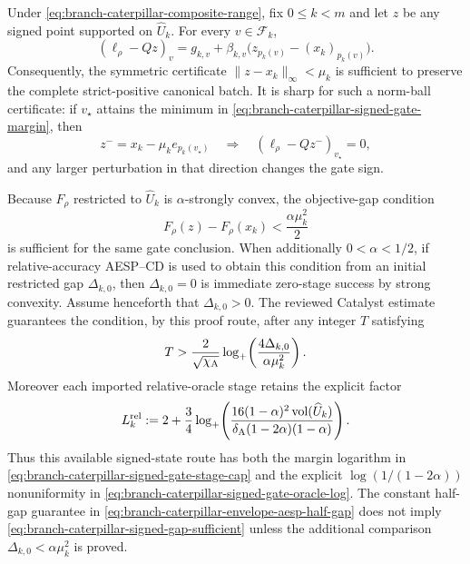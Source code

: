 \begin{proposition}
\label{prop:branch-caterpillar-signed-gate-margin}
Under \cref{eq:branch-caterpillar-composite-range}, fix $0\leq k<m$ and let
$z$ be any signed point supported on $\widehat U_k$.  For every
$v\in\mathcal F_k$,
\begin{equation}
 (\ell_\rho-Qz)_v
 =g_{k,v}+\beta_{k,v}
   \bigl(z_{p_k(v)}-(x_k)_{p_k(v)}\bigr).
 \label{eq:branch-caterpillar-signed-demand-identity}
\end{equation}
Consequently, the symmetric certificate
$\lVert z-x_k\rVert_\infty<\mu_k$ is sufficient to preserve the complete
strict-positive canonical batch.  It is sharp for such a norm-ball
certificate: if $v_\star$ attains the minimum in
\cref{eq:branch-caterpillar-signed-gate-margin}, then
\begin{equation}
 z^-=x_k-\mu_k e_{p_k(v_\star)}
 \quad\Longrightarrow\quad
 (\ell_\rho-Qz^- )_{v_\star}=0,
 \label{eq:branch-caterpillar-signed-gate-equality-witness}
\end{equation}
and any larger perturbation in that direction changes the gate sign.

Because $F_\rho$ restricted to $\widehat U_k$ is
$\alpha$-strongly convex, the objective-gap condition
\begin{equation}
 F_\rho(z)-F_\rho(x_k)<\frac{\alpha\mu_k^2}{2}
 \label{eq:branch-caterpillar-signed-gap-sufficient}
\end{equation}
is sufficient for the same gate conclusion.  When additionally
$0<\alpha<1/2$, if relative-accuracy AESP--CD is used to obtain this
condition from an initial restricted gap
$\Delta_{k,0}$, then $\Delta_{k,0}=0$ is immediate zero-stage success by
strong convexity.  Assume henceforth that $\Delta_{k,0}>0$.  The reviewed
Catalyst estimate guarantees the condition, by this proof route, after any
integer $T$ satisfying
\begin{equation}
 T>
 \frac{2}{\sqrt{\chi_{\rm A}}}
 \log_+\!\left(\frac{4\Delta_{k,0}}
                      {\alpha\mu_k^2}\right).
 \label{eq:branch-caterpillar-signed-gate-stage-cap}
\end{equation}
Moreover each imported relative-oracle stage retains the explicit factor
\begin{equation}
 L_k^{\rm rel}:=
 2+\frac34\log_+\!\left(
  \frac{16(1-\alpha)^2\operatorname{vol}(\widehat U_k)}
       {\delta_{\rm A}(1-2\alpha)(1-\alpha)}
                         \right).
 \label{eq:branch-caterpillar-signed-gate-oracle-log}
\end{equation}
Thus this available signed-state route has both the margin logarithm in
\cref{eq:branch-caterpillar-signed-gate-stage-cap} and the explicit
$\log(1/(1-2\alpha))$ nonuniformity in
\cref{eq:branch-caterpillar-signed-gate-oracle-log}.  The constant half-gap
guarantee in
\cref{eq:branch-caterpillar-envelope-aesp-half-gap} does not imply
\cref{eq:branch-caterpillar-signed-gap-sufficient} unless the additional
comparison $\Delta_{k,0}<\alpha\mu_k^2$ is proved.


\end{proposition}
